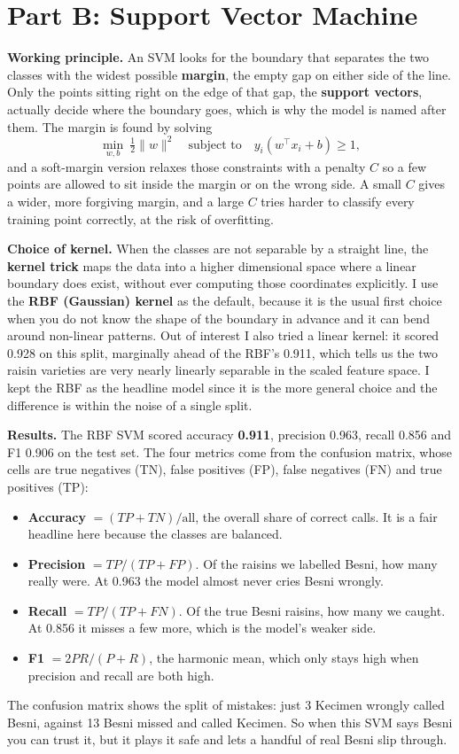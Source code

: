 \documentclass[11pt,a4paper]{article}
\begin{document}
\section*{Part B: Support Vector Machine}

\textbf{Working principle.} An SVM looks for the boundary that separates the two
classes with the widest possible \textbf{margin}, the empty gap on either side of
the line. Only the points sitting right on the edge of that gap, the
\textbf{support vectors}, actually decide where the boundary goes, which is why the
model is named after them. The margin is found by solving
\[ \min_{w,b}\ \tfrac{1}{2}\lVert w\rVert^2 \quad\text{subject to}\quad y_i(w^\top x_i + b) \ge 1, \]
and a soft-margin version relaxes those constraints with a penalty $C$ so a few
points are allowed to sit inside the margin or on the wrong side. A small $C$ gives
a wider, more forgiving margin, and a large $C$ tries harder to classify every
training point correctly, at the risk of overfitting.

\textbf{Choice of kernel.} When the classes are not separable by a straight line,
the \textbf{kernel trick} maps the data into a higher dimensional space where a
linear boundary does exist, without ever computing those coordinates explicitly.
I use the \textbf{RBF (Gaussian) kernel} as the default, because it is the usual
first choice when you do not know the shape of the boundary in advance and it can
bend around non-linear patterns. Out of interest I also tried a linear kernel: it
scored 0.928 on this split, marginally ahead of the RBF's 0.911, which tells us the
two raisin varieties are very nearly linearly separable in the scaled feature
space. I kept the RBF as the headline model since it is the more general choice and
the difference is within the noise of a single split.

\textbf{Results.} The RBF SVM scored accuracy \textbf{0.911}, precision 0.963,
recall 0.856 and F1 0.906 on the test set. The four metrics come from the confusion
matrix, whose cells are true negatives (TN), false positives (FP), false negatives
(FN) and true positives (TP):
\begin{itemize}
    \item \textbf{Accuracy} $=(TP+TN)/\text{all}$, the overall share of correct
    calls. It is a fair headline here because the classes are balanced.
    \item \textbf{Precision} $=TP/(TP+FP)$. Of the raisins we labelled Besni, how
    many really were. At 0.963 the model almost never cries Besni wrongly.
    \item \textbf{Recall} $=TP/(TP+FN)$. Of the true Besni raisins, how many we
    caught. At 0.856 it misses a few more, which is the model's weaker side.
    \item \textbf{F1} $=2PR/(P+R)$, the harmonic mean, which only stays high when
    precision and recall are both high.
\end{itemize}
The confusion matrix shows the split of mistakes: just 3 Kecimen wrongly called
Besni, against 13 Besni missed and called Kecimen. So when this SVM says Besni you
can trust it, but it plays it safe and lets a handful of real Besni slip through.
\end{document}
